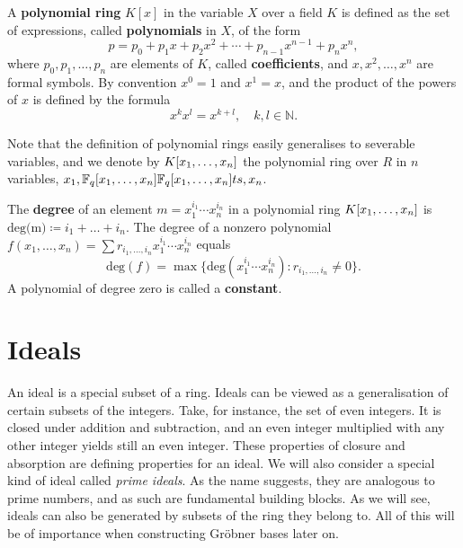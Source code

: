 \documentclass[english,bachelor]{liumaiex}
\begin{document}
\begin{define}
A \textbf{polynomial ring} $K[x]$ in the variable $X$ over a field $K$ is defined as the set of expressions, called \textbf{polynomials} in $X$, of the form
\begin{displaymath}
p = p_0+p_1x+p_2x^2+ \cdots +p_{n-1}x^{n-1}+p_nx^n,
\end{displaymath}
where $p_0, p_1, \dots, p_n$ are elements of $K$, called \textbf{coefficients}, and $x,x^2,\dots, x^n$ are formal symbols. By convention $x^0=1$ and $x^1=x$, and the product of the powers of $x$ is defined by the formula
\begin{displaymath}
x^kx^l = x^{k+l}, \quad k,l \in \mathbb{N}.
\end{displaymath}
\end{define}

Note that the definition of polynomial rings easily generalises to severable variables, and we denote by $K[x_1,\dots, x_n]$ the polynomial ring over $R$ in $n$ variables, $x_1, \do\newcommand{\polyfield}{\mathbb{F}_q[x_1,\dots,x_n]}ts, x_n$.

\begin{define}
The \textbf{degree} of an element $m=x_1^{i_1} \cdots x_n^{i_n}$ in a polynomial ring $K[x_1,\dots, x_n]$ is $\textrm{deg(m)}\coloneqq i_1+\dots+i_n.$ The degree of a nonzero polynomial $f(x_1,\dots,x_n) = \sum r_{i_1,\dots,i_n}x_1^{i_1}\cdots x_n^{i_n}$ equals 
\begin{displaymath}
\textrm{deg}(f) = \max\{\textrm{deg}(x_1^{i_1} \cdots x_n^{i_n}):r_{i_1,\dots,i_n} \neq 0\}.
\end{displaymath}
A polynomial of degree zero is called a \textbf{constant}.
\end{define}

\section{Ideals}
An ideal is a special subset of a ring. Ideals can be viewed as a generalisation of certain subsets of the integers. Take, for instance, the set of even integers. It is closed under addition and subtraction, and an even integer multiplied with any other integer yields still an even integer. These properties of closure and absorption are defining properties for an ideal. We will also consider a special kind of ideal called \emph{prime ideals}. As the name suggests, they are analogous to prime numbers, and as such are fundamental building blocks. As we will see, ideals can also be generated by subsets of the ring they belong to. All of this will be of importance when constructing Gröbner bases later on.
\end{document}
